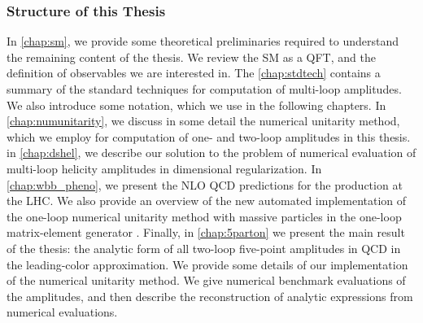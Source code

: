 \subsubsection{Structure of this Thesis}

In \cref{chap:sm}, we provide some theoretical preliminaries required to understand the remaining 
content of the thesis.
We review the SM as a QFT, and  the definition of observables we are interested in.
The \cref{chap:stdtech} contains a summary of the standard techniques for computation of multi-loop amplitudes.
We also introduce some notation, which we use in the following chapters.
In \cref{chap:numunitarity}, we discuss in some detail the numerical unitarity method, which we employ for computation
of one- and two-loop amplitudes in this thesis.
in \cref{chap:dshel}, we describe our solution to the problem of numerical evaluation of multi-loop helicity amplitudes in dimensional regularization.
In \cref{chap:wbb_pheno}, we present the NLO QCD predictions for the \Wbbn{} production at the LHC.
We also provide an overview of the new automated implementation of the one-loop numerical unitarity method with massive particles in the one-loop matrix-element generator \BlackHat{}.
Finally, in \cref{chap:5parton} we present the main result of the thesis: the analytic form of all two-loop five-point amplitudes in QCD in the leading-color approximation.
We provide some details of our implementation of the numerical unitarity method.
We give numerical benchmark evaluations of the amplitudes, 
and then describe the reconstruction of analytic expressions from numerical evaluations.
